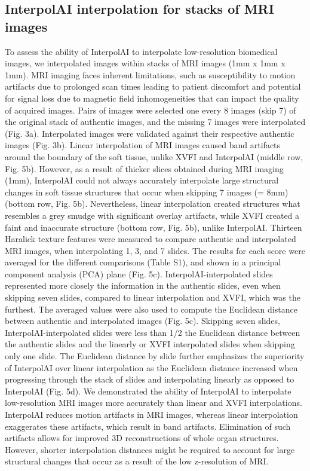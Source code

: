 \begin{refsection}
    \section{InterpolAI interpolation for stacks of MRI images}
    To assess the ability of InterpolAI to interpolate low-resolution biomedical images, we interpolated images within stacks of MRI images (1mm x 1mm x 1mm). MRI imaging faces inherent limitations, such as susceptibility to motion artifacts due to prolonged scan times leading to patient discomfort and potential for signal loss due to magnetic field inhomogeneities that can impact the quality of acquired images. Pairs of images were selected one every 8 images (skip 7) of the original stack of authentic images, and the missing 7 images were interpolated (Fig. 3a). Interpolated images were validated against their respective authentic images (Fig. 3b).
    Linear interpolation of MRI images caused band artifacts around the boundary of the soft tissue, unlike XVFI and InterpolAI (middle row, Fig. 5b). However, as a result of thicker slices obtained during MRI imaging (1mm), InterpolAI could not always accurately interpolate large structural changes in soft tissue structures that occur when skipping 7 images (= 8mm) (bottom row, Fig. 5b). Nevertheless, linear interpolation created structures what resembles a grey smudge with significant overlay artifacts, while XVFI created a faint and inaccurate structure (bottom row, Fig. 5b), unlike InterpolAI. 
    Thirteen Haralick texture features were measured to compare authentic and interpolated MRI images, when interpolating 1, 3, and 7 slides. The results for each score were averaged for the different comparisons (Table S1), and shown in a principal component analysis (PCA) plane (Fig. 5c). InterpolAI-interpolated slides represented more closely the information in the authentic slides, even when skipping seven slides, compared to linear interpolation and XVFI, which was the furthest. The averaged values were also used to compute the Euclidean distance between authentic and interpolated images (Fig. 5c). Skipping seven slides, InterpolAI-interpolated slides were less than 1/2 the Euclidean distance between the authentic slides and the linearly or XVFI interpolated slides when skipping only one slide. The Euclidean distance by slide further emphasizes the superiority of InterpolAI over linear interpolation as the Euclidean distance increased when progressing through the stack of slides and interpolating linearly as opposed to InterpolAI (Fig. 5d). 
    We demonstrated the ability of InterpolAI to interpolate low-resolution MRI images more accurately than linear and XVFI interpolations. InterpolAI reduces motion artifacts in MRI images, whereas linear interpolation exaggerates these artifacts, which result in band artifacts. Elimination of such artifacts allows for improved 3D reconstructions of whole organ structures. However, shorter interpolation distances might be required to account for large structural changes that occur as a result of the low z-resolution of MRI.
    

\end{refsection}
